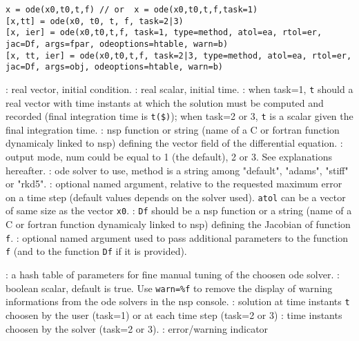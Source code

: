 
\begin{mandesc}
\end{mandesc}

\begin{calling_sequence}
\begin{verbatim}
x = ode(x0,t0,t,f) // or  x = ode(x0,t0,t,f,task=1)
[x,tt] = ode(x0, t0, t, f, task=2|3)
[x, ier] = ode(x0,t0,t,f, task=1, type=method, atol=ea, rtol=er, jac=Df, args=fpar, odeoptions=htable, warn=b)
[x, tt, ier] = ode(x0,t0,t,f, task=2|3, type=method, atol=ea, rtol=er, jac=Df, args=obj, odeoptions=htable, warn=b)
\end{verbatim}
\end{calling_sequence}
\begin{parameters}
  \begin{varlist}
    : real vector, initial condition.
    : real scalar, initial time.
    : when task=1, \verb+t+ should a real vector with time instants at which the solution must
    be computed and recorded (final integration time is \verb+t($)+); when task=2 or 3, \verb+t+ is a 
    scalar given the final integration time.
    : nsp function or string (name of a C or fortran function dynamicaly linked to nsp) 
               defining the vector field of the differential equation.
    : output mode, num could be equal to 1 (the default), 2 or 3. See explanations hereafter.
    : ode solver to use, method is a string among  "default", "adams", "stiff" or "rkd5".
    : optional named argument, relative to the requested maximum error on a time step 
    (default values depends on the solver used). \verb+atol+ can be a vector of same size as 
    the vector \verb+x0+.
    : \verb+Df+ should be a nsp function or a string (name of a C or fortran function dynamicaly linked 
                    to nsp) defining the Jacobian of function \verb+f+.
    : optional named argument used to pass additional parameters to the function \verb+f+ 
    (and to the function \verb+Df+ if it is provided). 

    : a hash table of parameters for fine manual tuning of the choosen ode solver.
    : boolean scalar, default is true. Use \verb+warn=%f+ to remove the display of warning 
                    informations from the ode solvers in the nsp console.
    : solution at time instants \verb+t+ choosen by the user (task=1) or at each time step (task=2 or 3)
    : time instants choosen by the solver (task=2 or 3).
    : error/warning indicator 
  \end{varlist}
\end{parameters}

